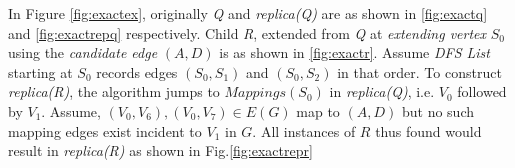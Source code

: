 \begin{exple}	
	In Figure \ref{fig:exactex}, originally \emph{Q} and \emph{replica(Q)} are
	as shown in \ref{fig:exactq} and \ref{fig:exactrepq} respectively. Child
	\emph{R}, extended from \emph{Q} at \emph{extending vertex} $S_0$ using the
	\emph{candidate edge} $(A, D)$ is as shown in \ref{fig:exactr}. Assume
	\emph{DFS List} starting at $S_0$ records edges $(S_0, S_1)$ and $(S_0,
	S_2)$ in that order. To construct \emph{replica(R)}, the algorithm jumps to
	$Mappings(S_0)$ in \emph{replica(Q)}, i.e. ${V_0}$ followed by ${V_1}$.
	Assume, $(V_0, V_6), (V_0, V_7)\in E(G)$ map to $(A, D)$ but no such
	mapping edges exist incident to $V_1$ in $G$. All instances of $R$ thus found
	would result in \emph{replica(R)} as shown in Fig.\ref{fig:exactrepr}
\end{exple}

